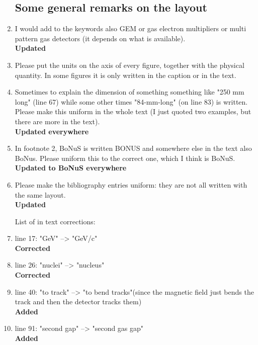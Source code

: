 \documentclass[a4paper,11pt,twoside]{article}
\begin{document}
\begin{enumerate}
\subsection*{ Some general remarks on the layout}

\item I would add to the keywords also GEM or gas electron multipliers or multi 
   pattern gas detectors (it depends on what is available).\\
{ \bf Updated} 

\item Please put the units on the axis of every figure, together with the 
   physical quantity. In some figures it is only written in the caption or in 
   the text.\\
{ \bf  } 

\item Sometimes to explain the dimension of something something like "250 mm 
   long" (line 67) while some other times "84-mm-long" (on line 83) is written. 
   Please make this uniform in the whole text (I just quoted two examples, but 
   there are more in the text).\\
{ \bf Updated everywhere} 

\item In footnote 2, BoNuS is written BONUS and somewhere else in the text also 
   BoNus. Please uniform this to the correct one, which I think is BoNuS.\\
{ \bf Updated to BoNuS everywhere} 

\item Please make the bibliography entries uniform: they are not all written 
   with the same layout.\\
{ \bf Updated} 

List of in text corrections:

\item line 17: "GeV" --> "GeV/c"\\
{ \bf Corrected} 

\item line 26: "nuclei" --> "nucleus"\\
{ \bf Corrected} 

\item line 40: "to track" --> "to bend tracks"(since the magnetic field just 
   bends the track and then the detector tracks them)\\
{ \bf Added} 

\item line 91: "second gap" --> "second gas gap"\\
{ \bf Added} 


\end{enumerate}
\end{document}
